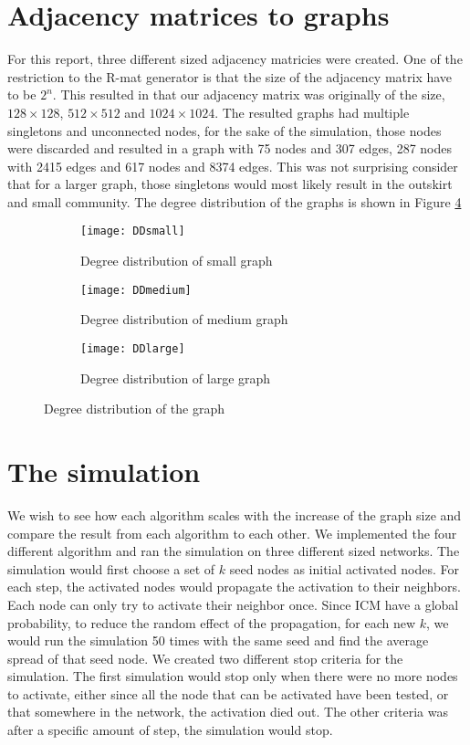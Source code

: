 \section{Adjacency matrices to graphs}
For this report, three different sized adjacency matricies were created. One of the restriction to the R-mat generator is that the size of the adjacency matrix have to be $2^n$. This resulted in that our adjacency matrix was originally of the size, $128 \times 128$, $512 \times 512$ and $1024 \times 1024$. The resulted graphs had multiple singletons and unconnected nodes, for the sake of the simulation, those nodes were discarded and resulted in a graph with 75 nodes and 307 edges, 287 nodes with 2415 edges and 617 nodes and 8374 edges. This was not surprising consider that for a larger graph, those singletons would most likely result in the outskirt and small community. The degree distribution of the graphs is shown in Figure \ref{fig:DD}

\begin{figure}[!ht]
	\begin{subfigure}{0.3\textwidth}
		\texttt{[image: DDsmall]}
		\caption{Degree distribution of small graph} 
		\label{fig:smallDegree}
	\end{subfigure}
	\begin{subfigure}{0.3\textwidth}
		\texttt{[image: DDmedium]}
		\caption{Degree distribution of medium graph} 
		\label{fig:mediumDegree}
	\end{subfigure}
	\begin{subfigure}{0.3\textwidth}
		\texttt{[image: DDlarge]}
		\caption{Degree distribution of large graph} 
		\label{fig:largeDegree}
	\end{subfigure}
	\caption{Degree distribution of the graph}
	\label{fig:DD}
\end{figure}



\section{The simulation}
We wish to see how each algorithm scales with the increase of the graph size and compare the result from each algorithm to each other. We implemented the four different algorithm and ran the simulation on three different sized networks. The simulation would first choose a set of $k$ seed nodes as initial activated nodes. For each step, the activated nodes would propagate the activation to their neighbors. Each node can only try to activate their neighbor once. Since ICM have a global probability, to reduce the random effect of the propagation, for each new $k$, we would run the simulation 50 times with the same seed and find the average spread of that seed node. We created two different stop criteria for the simulation. The first simulation would stop only when there were no more nodes to activate, either since all the node that can be activated have been tested, or that somewhere in the network, the activation died out. The other criteria was after a specific amount of step, the simulation would stop.

